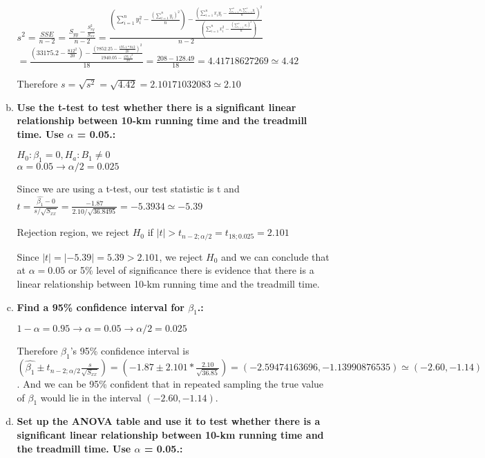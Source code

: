\documentclass{article}
\begin{document}
\begin{enumerate}[1.]
\begin{enumerate}[(a)]
\begingroup
\Large
$s^2 = \frac{SSE}{n-2} = \frac{S_{yy} - \frac{S_{xy}^2}{S_{xx}}}{n-2} = \frac{            (\sum_{i=1}^{n}{y_i^2} - \frac{ (\sum_{i=1}^{n}{y_i})^2}{n} )  - 
\frac{   ( \sum_{i=1}^{n}{x_iy_i }  - \frac{  \sum_{i=1}^{n}{x_i}  \sum_{i=1}^{n}{y_i}  }{n})^2     }
{    (\sum_{i=1}^{n}{x_i^2} - \frac{ (\sum_{i=1}^{n}{x_i})^2}{n} )     }}
{n - 2}$ \\
$ = \frac{ (33175.2 - \frac{812^2}{20}) - \frac{ (7852.25 - \frac{195.1 * 812}{20})^2}{1940.05-\frac{195.1^2}{20}}  }{18} = \frac{208 - 128.49}{18} = 4.41718627269 \simeq 4.42 $
\endgroup

Therefore $s = \sqrt{s^2} = \sqrt{4.42} = 2.10171032083 \simeq 2.10$

  \item \textbf{Use the t-test to test whether there is a significant linear relationship between 10-km
running time and the treadmill time. Use $\alpha$ = 0.05.: }

$H_0: \beta_1 = 0, H_a: B_1 \neq 0$ \\
$\alpha = 0.05 \to \alpha/2 = 0.025$

Since we are using a t-test, our test statistic is t and $t= \frac{\hat{\beta_1} - 0}{s/\sqrt{S_{xx}}} = \frac{-1.87}{2.10/\sqrt{36.8495}} = -5.3934 \simeq -5.39$

Rejection region, we reject $H_0$ if $|t| > t_{n-2;\alpha/2} = t_{18;0.025} = 2.101$

Since $|t| = |-5.39| = 5.39 > 2.101$, we reject $H_0$ and we can conclude that at $\alpha = 0.05$ or 5\% level of significance there is evidence that there is a linear relationship between 10-km running time and the treadmill time.

  \item \textbf{ Find a 95\% confidence interval for $\beta_1$.: }

$1 - \alpha = 0.95 \to \alpha = 0.05 \to \alpha/2 = 0.025$

Therefore $\beta_1$'s 95\% confidence interval is \\ 
$(\hat{\beta_1} \pm t_{n-2;\alpha/2}\frac{s}{\sqrt{S_{xx}}}) = (-1.87 \pm 2.101 * \frac{2.10}{\sqrt{36.85}}) = (-2.59474163696, -1.13990876535) \simeq (-2.60, -1.14) $. And we can be 95\% confident that in repeated sampling the true value of $\beta_1$ would lie in the interval $(-2.60, -1.14)$.

  \item \textbf{ Set up the ANOVA table and use it to test whether there is a significant linear relationship between 10-km running time and the treadmill time. Use $\alpha$ = 0.05.: }


\end{enumerate}
\end{enumerate}
\end{document}
